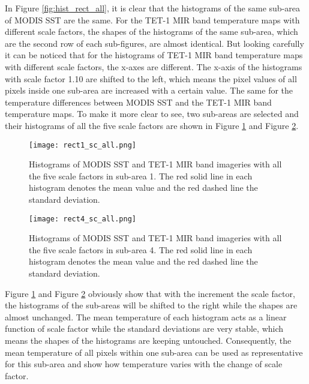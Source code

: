 \noindent In Figure \ref{fig:hist_rect_all}, it is clear that the histograms of the same sub-area of MODIS SST are the same. For the TET-1 MIR band temperature maps with different scale factors, the shapes of the histograms of the same sub-area, which are the second row of each sub-figures, are almost identical. But looking carefully it can be noticed that for the histograms of TET-1 MIR band temperature maps with different scale factors, the x-axes are different. The x-axis of the histograms with scale factor 1.10 are shifted to the left, which means the pixel values of all pixels inside one sub-area are increased with a certain value. The same for the temperature differences between MODIS SST and the TET-1 MIR band temperature maps. To make it more clear to see, two sub-areas are selected and their histograms of all the five scale factors are shown in Figure \ref{fig:rect1_sc_all} and Figure \ref{fig:rect4_sc_all}.\\

\begin{figure}[!htbp]
\centering
\texttt{[image: rect1\_sc\_all.png]}
\caption{Histograms of MODIS SST and TET-1 MIR band imageries with all the five scale factors in sub-area 1. The red solid line in each histogram denotes the mean value and the red dashed line the standard deviation.}
\label{fig:rect1_sc_all}
\end{figure}

\begin{figure}[!htbp]
\centering
\texttt{[image: rect4\_sc\_all.png]}
\caption{Histograms of MODIS SST and TET-1 MIR band imageries with all the five scale factors in sub-area 4. The red solid line in each histogram denotes the mean value and the red dashed line the standard deviation.}
\label{fig:rect4_sc_all}
\end{figure}

\noindent Figure \ref{fig:rect1_sc_all} and Figure \ref{fig:rect4_sc_all} obviously show that with the increment the scale factor, the histograms of the sub-areas will be shifted to the right while the shapes are almost unchanged. The mean temperature of each histogram acts as a linear function of scale factor while the standard deviations are very stable, which means the shapes of the histograms are keeping untouched. Consequently, the mean temperature of all pixels within one sub-area can be used as representative for this sub-area and show how temperature varies with the change of scale factor.\\

